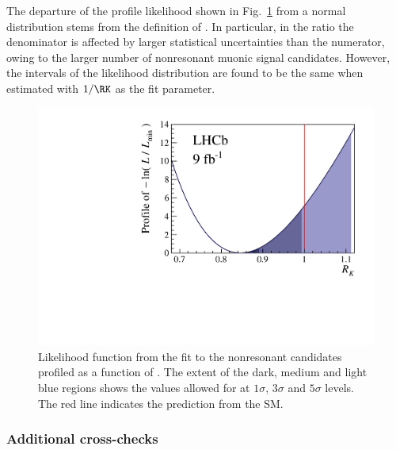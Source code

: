 The departure of the profile likelihood shown in Fig.~\ref{fig:profile_likelihood} from a normal distribution stems from the  definition of \RK. In particular,
in the \RK ratio the denominator is affected by larger statistical uncertainties than the numerator, owing to the larger number of nonresonant muonic signal candidates. However, the intervals of the likelihood distribution are found to be the same when estimated with $1/\RK$ as the fit parameter.


\begin{figure}[!t]
   \begin{center}
      \includegraphics[height=0.25\textheight]{figures/Fig8.pdf}
  \end{center}
     \caption{Likelihood function from the fit to the nonresonant \BuKll candidates profiled as a function of \RK. The extent of the  dark, medium and light blue  regions shows the values allowed for \RK at $1\sigma$, $3\sigma$ and $5\sigma$ levels. The red line indicates the prediction from the SM. }
    \label{fig:profile_likelihood}
\end{figure}



\subsubsection*{Additional cross-checks} 


